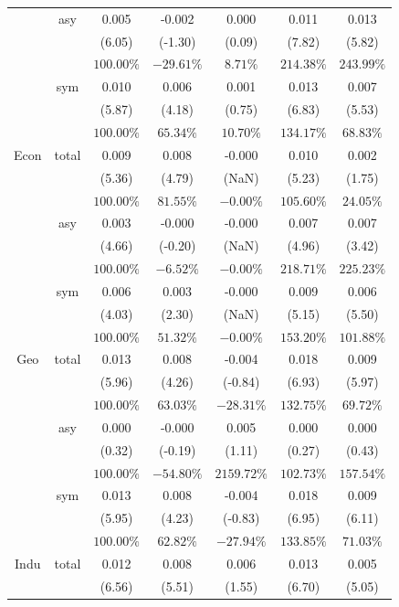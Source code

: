 \documentclass[
]{article}
\begin{document}
\begin{table}[H]
{\begin{tabular}{ccccccc}
   & asy & 0.005 & -0.002 & 0.000 & 0.011 & 0.013 \\ 
   &  & (6.05) & (-1.30) & (0.09) & (7.82) & (5.82) \\ 
   &  & $100.00\%$ & $-29.61\%$ & $8.71\%$ & $214.38\%$ & $243.99\%$ \\ 
   & sym & 0.010 & 0.006 & 0.001 & 0.013 & 0.007 \\ 
   &  & (5.87) & (4.18) & (0.75) & (6.83) & (5.53) \\ 
   &  & $100.00\%$ & $65.34\%$ & $10.70\%$ & $134.17\%$ & $68.83\%$ \\ 
   \hline 
Econ & total & 0.009 & 0.008 & -0.000 & 0.010 & 0.002 \\ 
   &  & (5.36) & (4.79) & (NaN) & (5.23) & (1.75) \\ 
   &  & $100.00\%$ & $81.55\%$ & $-0.00\%$ & $105.60\%$ & $24.05\%$ \\ 
   & asy & 0.003 & -0.000 & -0.000 & 0.007 & 0.007 \\ 
   &  & (4.66) & (-0.20) & (NaN) & (4.96) & (3.42) \\ 
   &  & $100.00\%$ & $-6.52\%$ & $-0.00\%$ & $218.71\%$ & $225.23\%$ \\ 
   & sym & 0.006 & 0.003 & -0.000 & 0.009 & 0.006 \\ 
   &  & (4.03) & (2.30) & (NaN) & (5.15) & (5.50) \\ 
   &  & $100.00\%$ & $51.32\%$ & $-0.00\%$ & $153.20\%$ & $101.88\%$ \\ 
   \hline 
Geo & total & 0.013 & 0.008 & -0.004 & 0.018 & 0.009 \\ 
   &  & (5.96) & (4.26) & (-0.84) & (6.93) & (5.97) \\ 
   &  & $100.00\%$ & $63.03\%$ & $-28.31\%$ & $132.75\%$ & $69.72\%$ \\ 
   & asy & 0.000 & -0.000 & 0.005 & 0.000 & 0.000 \\ 
   &  & (0.32) & (-0.19) & (1.11) & (0.27) & (0.43) \\ 
   &  & $100.00\%$ & $-54.80\%$ & $2159.72\%$ & $102.73\%$ & $157.54\%$ \\ 
   & sym & 0.013 & 0.008 & -0.004 & 0.018 & 0.009 \\ 
   &  & (5.95) & (4.23) & (-0.83) & (6.95) & (6.11) \\ 
   &  & $100.00\%$ & $62.82\%$ & $-27.94\%$ & $133.85\%$ & $71.03\%$ \\ 
   \hline 
Indu & total & 0.012 & 0.008 & 0.006 & 0.013 & 0.005 \\ 
   &  & (6.56) & (5.51) & (1.55) & (6.70) & (5.05) \\ 

\end{tabular}}
\end{table}
\end{document}
